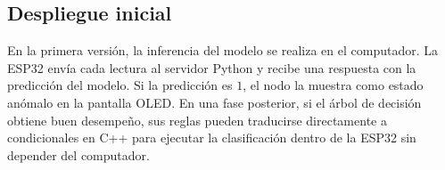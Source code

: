 \subsection{Despliegue inicial}

En la primera versi\'on, la inferencia del modelo se realiza en el computador. La ESP32 env\'ia cada lectura al servidor Python y recibe una respuesta con la predicci\'on del modelo. Si la predicci\'on es $1$, el nodo la muestra como estado an\'omalo en la pantalla OLED. En una fase posterior, si el \'arbol de decisi\'on obtiene buen desempe\~no, sus reglas pueden traducirse directamente a condicionales en C++ para ejecutar la clasificaci\'on dentro de la ESP32 sin depender del computador.
